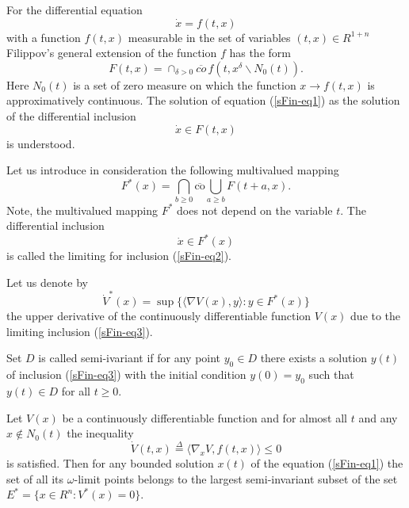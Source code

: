 \documentclass[12pt]{llncs}
\begin{document}
	
	
	
	
	
%

For the differential equation 
\begin{equation}
\label{sFin-eq1}
\dot{x}=f(t,x)
\end{equation}
with a function $f(t,x)$ measurable in the set of variables $(t,x)\in R^{1+n}$  Filippov's general extension of the function $f$ has the form
$$
F(t,x)=\cap_{\delta>0}\overline{co}\,f(t,x^{\delta}\backslash N_{0}(t)). 
$$
Here $N_{0}(t)$ is a set of zero measure on which the function $x\rightarrow f(t,x)$ is approximatively continuous. The solution of equation (\ref{sFin-eq1})  as the solution of the differential inclusion 
\begin{equation}
	\label{sFin-eq2}
	\dot{x}\in F(t,x) 
\end{equation}
	is understood. %

Let us introduce in consideration the following multivalued mapping $$F^{*}(x)=\bigcap_{b\geq 0}\overline{\mathrm{co}}\bigcup_{a\geq b} F(t+a,x). $$
Note, the multivalued mapping $F^{*}$ does not depend on the variable $t$.
The differential inclusion 
\begin{equation}
	\label{sFin-eq3}
	\dot{x}\in F^{*}(x)
\end{equation}
is called the limiting for inclusion
(\ref{sFin-eq2}). 

Let us denote by
$$
\dot{V}^{*}(x)=\sup\{\langle \nabla V(x), y\rangle:y\in F^{*}(x)\}
$$ 
the upper derivative of the continuously differentiable function $V(x)$ due to the limiting inclusion
(\ref{sFin-eq3}).

Set $D$ is called semi-ivariant if for any point $y_{0}\in D$ there exists a solution $y(t)$ of inclusion 
(\ref{sFin-eq3}) 
with the initial condition $y(0)=y_{0}$ 
such that $y(t)\in D$ for all $t\geq 0$. 

\begin{theorem}
Let  $V(x)$ be a continuously differentiable function and 
for almost all $t$ and any $x\not\in N_{0}(t)$ the inequality
$$
\dot{V}(t,x)\stackrel{\Delta}{=}\langle\nabla_{x}V,f(t,x)\rangle\leq 0
$$
is satisfied. 
Then
for any bounded solution $x(t)$ of the equation
(\ref{sFin-eq1})
the set of all its $\omega$-limit points belongs to the largest semi-invariant subset of the set $ E^{*}=\{x\in R^{n}:V^{*}(x)=0\}$.  
\end{theorem}
\end{document}
